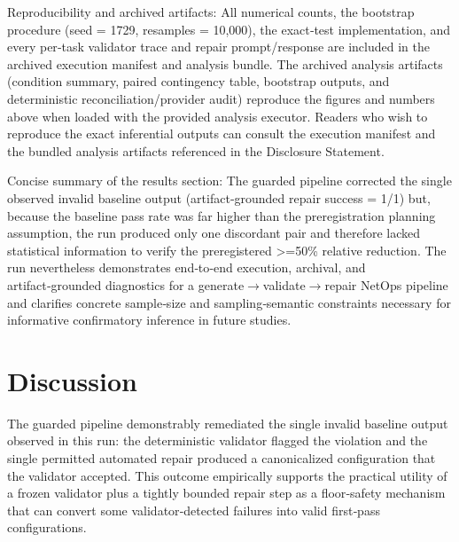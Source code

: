 \documentclass[conference]{IEEEtran}
\begin{document}
Reproducibility and archived artifacts: All numerical counts, the bootstrap procedure (seed = 1729, resamples = 10,000), the exact‑test implementation, and every per‑task validator trace and repair prompt/response are included in the archived execution manifest and analysis bundle. The archived analysis artifacts (condition summary, paired contingency table, bootstrap outputs, and deterministic reconciliation/provider audit) reproduce the figures and numbers above when loaded with the provided analysis executor. Readers who wish to reproduce the exact inferential outputs can consult the execution manifest and the bundled analysis artifacts referenced in the Disclosure Statement.

Concise summary of the results section: The guarded pipeline corrected the single observed invalid baseline output (artifact‑grounded repair success = 1/1) but, because the baseline pass rate was far higher than the preregistration planning assumption, the run produced only one discordant pair and therefore lacked statistical information to verify the preregistered >=50\% relative reduction. The run nevertheless demonstrates end‑to‑end execution, archival, and artifact‑grounded diagnostics for a generate\ensuremath{\rightarrow}validate\ensuremath{\rightarrow}repair NetOps pipeline and clarifies concrete sample‑size and sampling‑semantic constraints necessary for informative confirmatory inference in future studies.

\section{Discussion}
The guarded pipeline demonstrably remediated the single invalid baseline output observed in this run: the deterministic validator flagged the violation and the single permitted automated repair produced a canonicalized configuration that the validator accepted. This outcome empirically supports the practical utility of a frozen validator plus a tightly bounded repair step as a floor‑safety mechanism that can convert some validator‑detected failures into valid first‑pass configurations.
\end{document}
